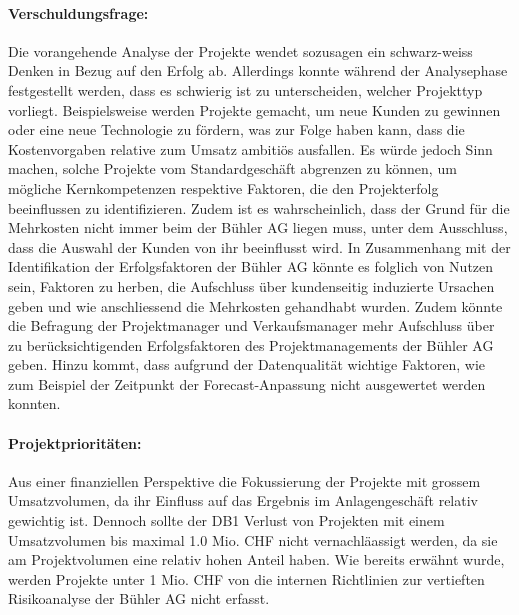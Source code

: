 \paragraph{Verschuldungsfrage:} Die vorangehende Analyse der Projekte wendet sozusagen ein schwarz-weiss Denken in Bezug auf den Erfolg ab. Allerdings konnte während der Analysephase festgestellt werden, dass es schwierig ist zu unterscheiden, welcher Projekttyp vorliegt. Beispielsweise werden Projekte gemacht, um neue Kunden zu gewinnen oder eine neue Technologie zu fördern, was zur Folge haben kann, dass die Kostenvorgaben relative zum Umsatz ambitiös ausfallen. Es würde jedoch Sinn machen, solche Projekte vom Standardgeschäft abgrenzen zu können, um mögliche Kernkompetenzen respektive Faktoren, die den Projekterfolg beeinflussen zu identifizieren. Zudem ist es wahrscheinlich, dass der Grund für die Mehrkosten nicht immer beim der Bühler AG liegen muss, unter dem Ausschluss, dass die Auswahl der Kunden von ihr beeinflusst wird. In Zusammenhang mit der Identifikation der Erfolgsfaktoren der Bühler AG könnte es folglich von Nutzen sein, Faktoren zu herben, die Aufschluss über kundenseitig induzierte Ursachen geben und wie anschliessend die Mehrkosten gehandhabt wurden. Zudem könnte die Befragung der Projektmanager und Verkaufsmanager mehr Aufschluss über zu berücksichtigenden Erfolgsfaktoren des Projektmanagements der Bühler AG geben. Hinzu kommt, dass aufgrund der Datenqualität wichtige Faktoren, wie zum Beispiel der Zeitpunkt der Forecast-Anpassung nicht ausgewertet werden konnten.
\paragraph{Projektprioritäten:} Aus einer finanziellen Perspektive die Fokussierung der Projekte mit grossem Umsatzvolumen, da ihr Einfluss auf das Ergebnis im Anlagengeschäft relativ gewichtig ist. Dennoch sollte der DB1 Verlust von Projekten mit einem Umsatzvolumen bis maximal 1.0 Mio. CHF nicht vernachläassigt werden, da sie am Projektvolumen eine relativ hohen Anteil haben. Wie bereits erwähnt wurde, werden Projekte unter 1 Mio. CHF von die internen Richtlinien zur vertieften Risikoanalyse der Bühler AG nicht erfasst.
